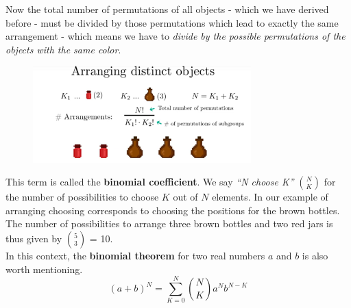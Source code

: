 \documentclass[12pt, a4paper]{scrartcl}
\begin{document}
Now the total number of permutations of all objects - which we have derived before - must be divided by those permutations which lead to exactly the same arrangement - which means we have to \textit{divide by the possible permutations of the objects with the same color}.
 \begin{figure}[H]
	\centering
	\includegraphics[width=0.75\textwidth]{4_2.png}
\end{figure}
This term is called the \textbf{binomial coefficient}. 
We say \textit{``N choose K''} ${N\choose K}$ for the number of possibilities to choose $K$ out of $N$ elements. In our example of arranging choosing corresponds to choosing the positions for the brown bottles. The number of possibilities to arrange three brown bottles and two red jars is thus given by ${5 \choose 3}$ = 10.\\


In this context, the \textbf{binomial theorem} for two real numbers $a$ and $b$ is also worth mentioning.
\begin{equation*}\boxed{(a+b)^N = \sum_{K=0}^{N}{N\choose K}a^Nb^{N-K}
}\end{equation*}\\
\\
\end{document}
